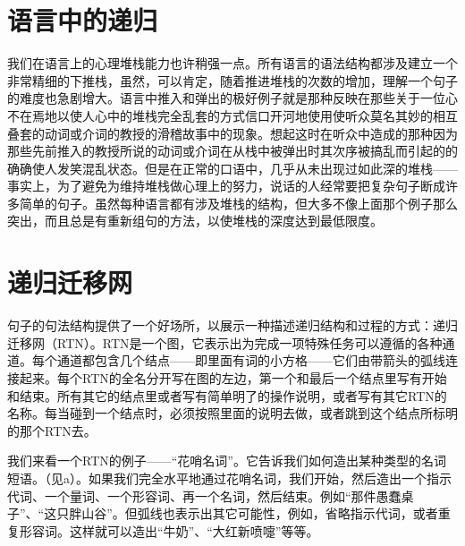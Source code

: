 \section{语言中的递归}

我们在语言上的心理堆栈能力也许稍强一点。所有语言的语法结构都涉及建立一个非常精细的下推栈，虽然，可以肯定，随着推进堆栈的次数的增加，理解一个句子的难度也急剧增大。语言中推入和弹出的极好例子就是那种反映在那些关于一位心不在焉地以使人心中的堆栈完全乱套的方式信口开河地使用使听众莫名其妙的相互叠套的动词或介词的教授的滑稽故事中的现象。想起这时在听众中造成的那种因为那些先前推入的教授所说的动词或介词在从栈中被弹出时其次序被搞乱而引起的的确确使人发笑混乱状态。但是在正常的口语中，几乎从未出现过如此深的堆栈——事实上，为了避免为维持堆栈做心理上的努力，说话的人经常要把复杂句子断成许多简单的句子。虽然每种语言都有涉及堆栈的结构，但大多不像上面那个例子那么突出，而且总是有重新组句的方法，以使堆栈的深度达到最低限度。

\section{递归迁移网}

句子的句法结构提供了一个好场所，以展示一种描述递归结构和过程的方式：递归迁移网（RTN）。RTN是一个图，它表示出为完成一项特殊任务可以遵循的各种通道。每个通道都包含几个结点——即里面有词的小方格——它们由带箭头的弧线连接起来。每个RTN的全名分开写在图的左边，第一个和最后一个结点里写有开始和结束。所有其它的结点里或者写有简单明了的操作说明，或者写有其它RTN的名称。每当碰到一个结点时，必须按照里面的说明去做，或者跳到这个结点所标明的那个RTN去。

我们来看一个RTN的例子——“花哨名词”。它告诉我们如何造出某种类型的名词短语。（见a）。如果我们完全水平地通过花哨名词，我们开始，然后造出一个指示代词、一个量词、一个形容词、再一个名词，然后结束。例如“那件愚蠢桌子”、“这只胖山谷”。但弧线也表示出其它可能性，例如，省略指示代词，或者重复形容词。这样就可以造出“牛奶”、“大红新喷嚏”等等。

